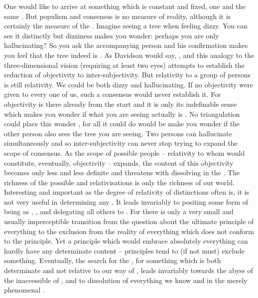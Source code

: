 One would like to arrive at something which is constant and fixed, one and the
same .  But populism and consensus is no measure of
reality, although it is certainly the measure of the .  Imagine seeing a tree when feeling dizzy. You
can see it distinctly but dizziness makes you wonder: perhaps you are only
hallucinating? So you ask the accompanying person and his confirmation makes you
feel that the tree indeed is . As Davidson would say, , and this analogy to the three-dimensional vision (requiring
at least two eyes) attempts to establish the reduction of objectivity to
inter-subjectivity. But relativity to a group of persons is still relativity. We
could be both dizzy and hallucinating. If no objectivity were given to every one
of us, such a consensus would never establish it. For objectivity is there
already from the start and it is only its indefinable sense which makes you
wonder if what you are seeing actually is . No triangulation could
place this wonder , for all it could do would be make you
wonder if the other person also sees the tree you are seeing. Two persons can
hallucinate simultaneously and so inter-subjectivity can never stop trying to
expand the scope of consensus.  As the scope of possible people -- relativity to
whom would constitute, eventually, objectivity -- expands, the content of this
objectivity becomes only less and less definite and threatens with dissolving in
the .  The richness of the possible  and
relativisations is only the richness of our world.  Interesting and important as
the degree of relativity of distinctions often is, it is not very useful in
determining any . It leads invariably to positing some
form of being as , , and delegating all
others to .  For there is only a very small and usually
imperceptible transition from the question about the ultimate principle of
everything to the exclusion from the reality of everything which does not
conform to the  principle. Yet a principle which would embrace
absolutely everything can hardly have any determinate content -- principles tend
to (if not must) exclude something.  Eventually, the search for the ,
for something which is both determinate and not relative to our way of
, leads invariably towards the abyss of the inaccessible
 of , and to dissolution of everything we
know and  in the merely phenomenal .

